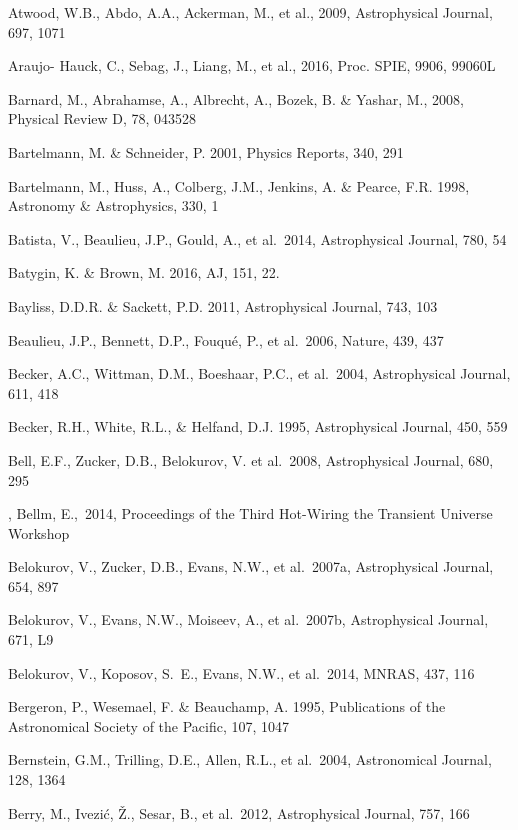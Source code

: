\documentclass{emulateapj}
\begin{document}
\begin{thebibliography}{}
\bibitem[()]{} Atwood, W.B., Abdo, A.A., Ackerman, M., et al., 2009, Astrophysical Journal, 697, 1071

\bibitem[()]{} Araujo- Hauck, C., Sebag, J., Liang, M., et al., 2016,  Proc. SPIE, 9906, 99060L  

\bibitem[()]{} Barnard, M., Abrahamse, A., Albrecht, A., Bozek, B. \& Yashar, M., 2008, Physical Review D, 78, 043528

\bibitem[()]{} Bartelmann, M. \& Schneider, P. 2001, Physics Reports, 340, 291

\bibitem[()]{} Bartelmann, M., Huss, A., Colberg, J.M., Jenkins, A. \& Pearce, F.R. 1998, Astronomy \&
             Astrophysics, 330, 1

\bibitem[()]{} Batista, V., Beaulieu, J.P., Gould, A., et al.~2014, Astrophysical Journal, 780, 54

\bibitem[()]{} Batygin, K. \& Brown, M. 2016, AJ, 151, 22.

\bibitem[()]{} Bayliss, D.D.R. \& Sackett, P.D. 2011, Astrophysical Journal, 743, 103

\bibitem[()]{} Beaulieu, J.P., Bennett, D.P., Fouqu\'{e}, P., et al.~2006, Nature, 439, 437

\bibitem[()]{} Becker, A.C., Wittman, D.M., Boeshaar, P.C., et al.~2004, Astrophysical Journal, 611, 418

\bibitem[()]{} Becker, R.H., White, R.L., \& Helfand, D.J. 1995, Astrophysical Journal, 450, 559

\bibitem[()]{} Bell, E.F., Zucker, D.B., Belokurov, V. et al.~2008, Astrophysical Journal, 680, 295

\bibitem[()]{}, Bellm, E.,~2014, Proceedings of the Third Hot-Wiring the Transient Universe Workshop

\bibitem[()]{} Belokurov, V., Zucker, D.B., Evans, N.W., et al.~2007a, Astrophysical Journal, 654, 897

\bibitem[()]{} Belokurov, V., Evans, N.W., Moiseev, A., et al.~2007b, Astrophysical Journal, 671, L9

\bibitem[()]{} Belokurov, V., Koposov, S.~E., Evans, N.W., et al.~2014, MNRAS, 437, 116

\bibitem[()]{} Bergeron, P., Wesemael, F. \& Beauchamp, A. 1995, Publications of the Astronomical Society
                   of the Pacific, 107, 1047

\bibitem[()]{} Bernstein, G.M., Trilling, D.E., Allen, R.L., et al.~2004, Astronomical Journal, 128, 1364

\bibitem[()]{} Berry, M., Ivezi\'c, \v Z., Sesar, B., et al.~2012, Astrophysical Journal, 757, 166


\end{thebibliography}
\end{document}
